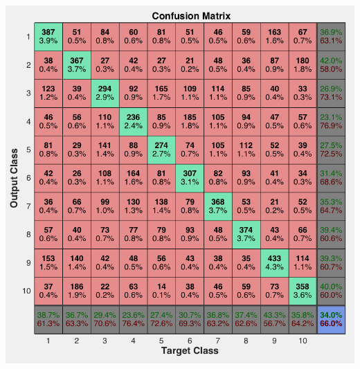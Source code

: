 \documentclass[11pt]{article}
\begin{document}
\begin{center}
\includegraphics[scale=0.5]{confusion.png} \\
\end{center}
\end{document}

